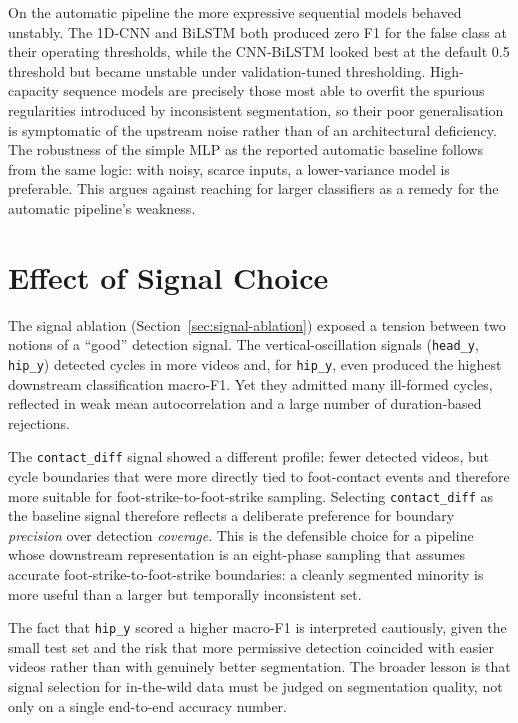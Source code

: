 On the automatic pipeline the more expressive sequential models behaved
unstably. The 1D-CNN and BiLSTM both produced zero F1 for the false class at
their operating thresholds, while the CNN-BiLSTM looked best at the default
0.5 threshold but became unstable under validation-tuned thresholding. High-capacity sequence models
are precisely those most able to overfit the spurious regularities introduced
by inconsistent segmentation, so their poor generalisation is symptomatic of
the upstream noise rather than of an architectural deficiency. The robustness
of the simple MLP as the reported automatic baseline follows from the same
logic: with noisy, scarce inputs, a lower-variance model is preferable. This
argues against reaching for larger classifiers as a remedy for the automatic
pipeline's weakness.

\section{Effect of Signal Choice}
\label{sec:disc-signal}

The signal ablation (Section~\ref{sec:signal-ablation}) exposed a tension
between two notions of a ``good'' detection signal. The vertical-oscillation
signals (\texttt{head\_y}, \texttt{hip\_y}) detected cycles in more videos and,
for \texttt{hip\_y}, even produced the highest downstream classification
macro-F1. Yet they admitted many ill-formed cycles, reflected in weak mean
autocorrelation and a large number of duration-based rejections.

The \texttt{contact\_diff} signal showed a different profile: fewer detected
videos, but cycle boundaries that were more directly tied to foot-contact
events and therefore more suitable for foot-strike-to-foot-strike sampling.
Selecting \texttt{contact\_diff} as the baseline signal therefore reflects a
deliberate preference for boundary \emph{precision} over detection
\emph{coverage}. This is the defensible choice for a pipeline whose downstream
representation is an eight-phase sampling that assumes accurate
foot-strike-to-foot-strike boundaries: a cleanly segmented minority is more
useful than a larger but temporally inconsistent set. 

The fact that \texttt{hip\_y} scored a higher macro-F1 is interpreted cautiously, given the
small test set and the risk that more permissive detection coincided with
easier videos rather than with genuinely better segmentation. The broader
lesson is that signal selection for in-the-wild data must be judged on
segmentation quality, not only on a single end-to-end accuracy number.

